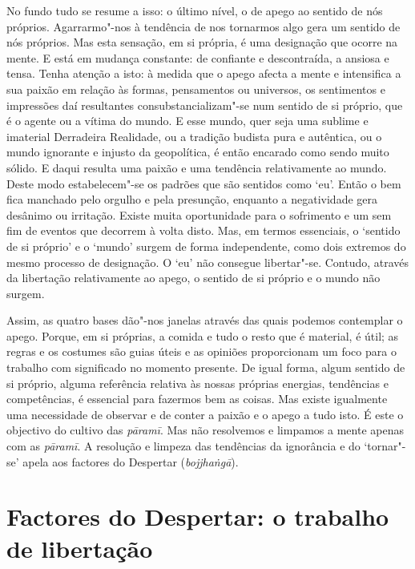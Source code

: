 No fundo tudo se resume a isso: o último nível, o de apego ao sentido de nós
próprios. Agarrarmo"-nos à tendência de nos tornarmos algo gera um sentido de
nós próprios. Mas esta sensação, em si própria, é uma designação que ocorre na
mente. E está em mudança constante: de confiante e descontraída, a ansiosa e
tensa. Tenha atenção a isto: à medida que o apego afecta a mente e intensifica a
sua paixão em relação às formas, pensamentos ou universos, os sentimentos e
impressões daí resultantes consubstancializam"-se num sentido de si próprio, que
é o agente ou a vítima do mundo. E esse mundo, quer seja uma sublime e imaterial
Derradeira Realidade, ou a tradição budista pura e autêntica, ou o mundo
ignorante e injusto da geopolítica, é então encarado como sendo muito sólido. E
daqui resulta uma paixão e uma tendência relativamente ao mundo. Deste modo
estabelecem"-se os padrões que são sentidos como `eu'. Então o bem fica manchado
pelo orgulho e pela presunção, enquanto a negatividade gera desânimo ou
irritação. Existe muita oportunidade para o sofrimento e um sem fim de eventos
que decorrem à volta disto. Mas, em termos essenciais, o `sentido de si próprio'
e o `mundo' surgem de forma independente, como dois extremos do mesmo processo
de designação. O `eu' não consegue libertar"-se. Contudo, através da libertação
relativamente ao apego, o sentido de si próprio e o mundo não surgem.

Assim, as quatro bases dão"-nos janelas através das quais podemos contemplar o
apego. Porque, em si próprias, a comida e tudo o resto que é material, é útil;
as regras e os costumes são guias úteis e as opiniões proporcionam um foco para
o trabalho com significado no momento presente. De igual forma, algum sentido de
si próprio, alguma referência relativa às nossas próprias energias, tendências e
competências, é essencial para fazermos bem as coisas. Mas existe igualmente uma
necessidade de observar e de conter a paixão e o apego a tudo isto. É este o
objectivo do cultivo das \emph{pāramī}. Mas não resolvemos e limpamos a mente
apenas com as \emph{pāramī}. A resolução e limpeza das tendências da ignorância
e do `tornar"-se' apela aos factores do Despertar (\emph{bojjhaṅgā}).

\section{Factores do Despertar: o trabalho de libertação}

